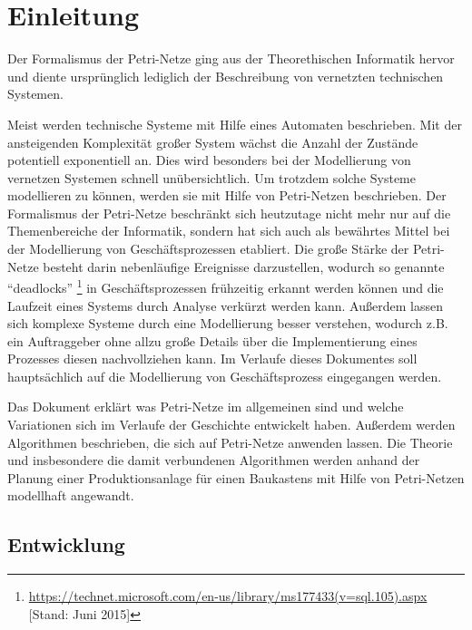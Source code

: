 
\chapter{Einleitung}
Der Formalismus der Petri-Netze ging aus der Theorethischen Informatik hervor
und diente ursprünglich lediglich der Beschreibung von vernetzten technischen Systemen.

Meist werden technische Systeme mit Hilfe eines Automaten beschrieben.
Mit der ansteigenden Komplexität großer System wächst die Anzahl der Zustände potentiell exponentiell an.
Dies wird besonders bei der Modellierung von vernetzen Systemen schnell unübersichtlich.
Um trotzdem solche Systeme modellieren zu können, werden sie mit Hilfe von Petri-Netzen beschrieben.
Der Formalismus der Petri-Netze beschränkt sich heutzutage nicht mehr nur auf die Themenbereiche der Informatik,
sondern hat sich auch als bewährtes Mittel bei der Modellierung von Geschäftsprozessen etabliert.
Die große Stärke der Petri-Netze besteht darin nebenläufige Ereignisse darzustellen,
wodurch so genannte \enquote{deadlocks} \footnote{\url{https://technet.microsoft.com/en-us/library/ms177433(v=sql.105).aspx} [Stand: Juni 2015]}
in Geschäftsprozessen frühzeitig erkannt werden können und
die Laufzeit eines Systems durch Analyse verkürzt werden kann.
Außerdem lassen sich komplexe Systeme durch eine Modellierung besser verstehen,
wodurch z.B. ein Auftraggeber ohne allzu große Details über die Implementierung eines Prozesses
diesen nachvollziehen kann.
Im Verlaufe dieses Dokumentes soll hauptsächlich auf die Modellierung von Geschäftsprozess eingegangen werden.

Das Dokument erklärt was Petri-Netze im allgemeinen sind und
welche Variationen sich im Verlaufe der Geschichte entwickelt haben.
Außerdem werden Algorithmen beschrieben, die sich auf Petri-Netze anwenden lassen.
Die Theorie und insbesondere die damit verbundenen Algorithmen
werden anhand der Planung einer Produktionsanlage für einen Baukastens
mit Hilfe von Petri-Netzen modellhaft angewandt.


\section{Entwicklung}
